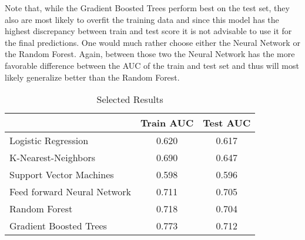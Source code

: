 
Note that, while the Gradient Boosted Trees perform best on the test set, they also are most likely to overfit the training data and since this model has the highest discrepancy between train and test score it is not advisable to use it for  the final predictions. One would much rather choose either the Neural Network or the Random Forest. Again, between those two the Neural Network has the more favorable difference between the AUC of the train and test set and thus will most likely generalize better 
than the Random Forest.

\begin{table}
\centering
\caption{Selected Results}
\begin{tabular}{lcc}

                            & Train AUC & Test AUC \\ \hline
Logistic Regression         & 0.620     & 0.617    \\
K-Nearest-Neighbors         & 0.690     & 0.647    \\
Support Vector Machines     & 0.598     & 0.596    \\
Feed forward Neural Network & 0.711     & 0.705    \\
Random Forest               & 0.718     & 0.704    \\
Gradient Boosted Trees      & 0.773     & 0.712   
\end{tabular}
\end{table}
